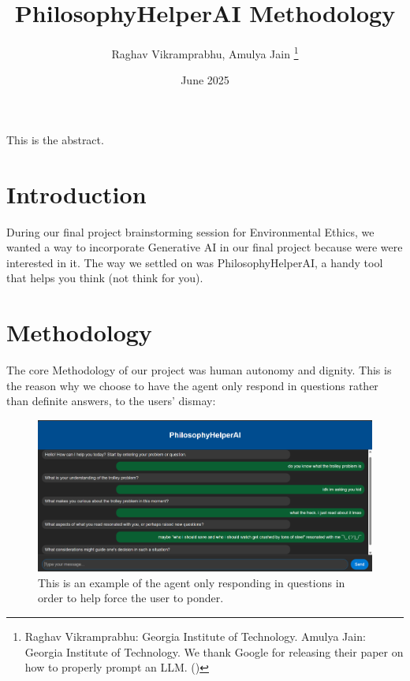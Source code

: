 \documentclass[letterpaper,11pt,leqno]{article}
\begin{document}
\title{PhilosophyHelperAI Methodology}

\author{Raghav Vikramprabhu, Amulya Jain
%
\thanks{Raghav Vikramprabhu: Georgia Institute of Technology. Amulya Jain: Georgia Institute of Technology. We thank Google for releasing their paper on how to properly prompt an LLM. (\cite{PromptEngineering}) }}

\date{June 2025}   


\begin{titlepage}
\maketitle

This is the abstract. 

\end{titlepage}


\section{Introduction}\label{s:introduction}
 
During our final project brainstorming session for Environmental Ethics, we wanted a way to incorporate Generative AI in our final project because were were interested in it. The way we settled on was PhilosophyHelperAI, a handy tool that helps you think (not think for you).


\section{Methodology}\label{s:section}

The core Methodology of our project was human autonomy and dignity.
This is the reason why we choose to have the agent only respond in questions rather than definite answers, to the users' dismay:

\begin{figure}[h!]
  \centering
  \includegraphics[width=\textwidth]{docs/images/userresponse1.png}
  \caption{This is an example of the agent only responding in questions in order to help force the user to ponder.}
  \label{fig:sample}
\end{figure}
\end{document}
